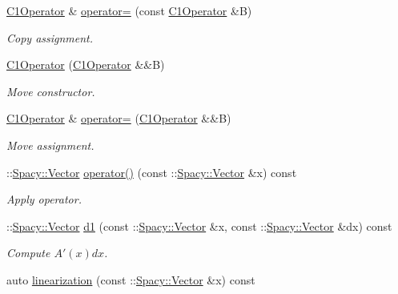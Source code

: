 \begin{DoxyCompactItemize}
\item 
\hyperlink{classSpacy_1_1Kaskade_1_1C1Operator}{\-C1\-Operator} \& \hyperlink{classSpacy_1_1Kaskade_1_1C1Operator_ac378b7b319e5160a7ac19a3697b4291a}{operator=} (const \hyperlink{classSpacy_1_1Kaskade_1_1C1Operator}{\-C1\-Operator} \&\-B)
\begin{DoxyCompactList}\small\item\em \-Copy assignment. \end{DoxyCompactList}\item 
\hyperlink{classSpacy_1_1Kaskade_1_1C1Operator_af75af5b5ee04c86a776d52bc8176d56e}{\-C1\-Operator} (\hyperlink{classSpacy_1_1Kaskade_1_1C1Operator}{\-C1\-Operator} \&\&\-B)
\begin{DoxyCompactList}\small\item\em \-Move constructor. \end{DoxyCompactList}\item 
\hyperlink{classSpacy_1_1Kaskade_1_1C1Operator}{\-C1\-Operator} \& \hyperlink{classSpacy_1_1Kaskade_1_1C1Operator_a99a3c4fc63c5d72285021376c6e57b64}{operator=} (\hyperlink{classSpacy_1_1Kaskade_1_1C1Operator}{\-C1\-Operator} \&\&\-B)
\begin{DoxyCompactList}\small\item\em \-Move assignment. \end{DoxyCompactList}\item 
\-::\hyperlink{classSpacy_1_1Vector}{\-Spacy\-::\-Vector} \hyperlink{classSpacy_1_1Kaskade_1_1C1Operator_aae23a007cd7a66f90bbb1c93da34735d}{operator()} (const \-::\hyperlink{classSpacy_1_1Vector}{\-Spacy\-::\-Vector} \&x) const 
\begin{DoxyCompactList}\small\item\em \-Apply operator. \end{DoxyCompactList}\item 
\-::\hyperlink{classSpacy_1_1Vector}{\-Spacy\-::\-Vector} \hyperlink{classSpacy_1_1Kaskade_1_1C1Operator_a32cfd05c372cc4bc8d7e0e8aedc1e8b9}{d1} (const \-::\hyperlink{classSpacy_1_1Vector}{\-Spacy\-::\-Vector} \&x, const \-::\hyperlink{classSpacy_1_1Vector}{\-Spacy\-::\-Vector} \&dx) const 
\begin{DoxyCompactList}\small\item\em \-Compute $A'(x)dx$. \end{DoxyCompactList}\item 
\hypertarget{classSpacy_1_1Kaskade_1_1C1Operator_afb9837bb1c40e00b53e7430c745b1931}{auto \hyperlink{classSpacy_1_1Kaskade_1_1C1Operator_afb9837bb1c40e00b53e7430c745b1931}{linearization} (const \-::\hyperlink{classSpacy_1_1Vector}{\-Spacy\-::\-Vector} \&x) const }\label{classSpacy_1_1Kaskade_1_1C1Operator_afb9837bb1c40e00b53e7430c745b1931}


\end{DoxyCompactItemize}
